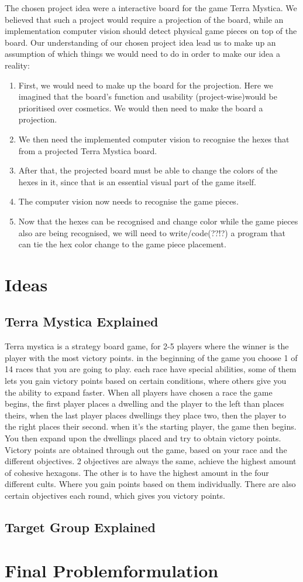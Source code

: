 The chosen project idea were a interactive board for the game Terra Mystica. We believed that such a project would require a projection of the board, while an implementation computer vision should detect physical game pieces on top of the board.
Our understanding of our chosen project idea lead us to make up an assumption of which things we would need to do in order to make our idea a reality:
\begin{enumerate}
\item First, we would need to make up the board for the projection. Here we imagined that the board's function and usability (project-wise)would be prioritised over cosmetics. We would then need to make the board a projection.
\item We then need the implemented computer vision to recognise the hexes that from a projected Terra Mystica board.
\item After that, the projected board must be able to change the colors of the hexes in it, since that is an essential visual part of the game itself.
\item The computer vision now needs to recognise the game pieces.
\item Now that the hexes can be recognised and change color while the game pieces also are being recognised, we will need to write/code(??!?) a program that can tie the hex color change to the game piece placement.
\end{enumerate}

\section{Ideas}\label{sec:idea}

\subsection{Terra Mystica Explained}
Terra mystica is a strategy board game, for 2-5 players where the winner is the player with the most victory points. in the beginning of the game you choose 1 of 14 races that you are going to play. each race have special abilities, some of them lets you gain victory points based on certain conditions, where others give you the ability to expand faster. When all players have chosen a race the game begins, the first player places a dwelling and the player to the left than places theirs, when the last player places dwellings they place two, then the player to the right places their second. when it's the starting player, the game then begins. You then expand upon the dwellings placed and try to obtain victory points. Victory points are obtained through out the game, based on your race and the different objectives. 2 objectives are always the same, achieve the highest amount of cohesive hexagons. The other is to have the highest amount in the four different cults. Where you gain points based on them individually. There are also certain objectives each round, which gives you victory points. 

 
\subsection{Target Group Explained}

\section{Final Problemformulation}\label{sec:finalprob}